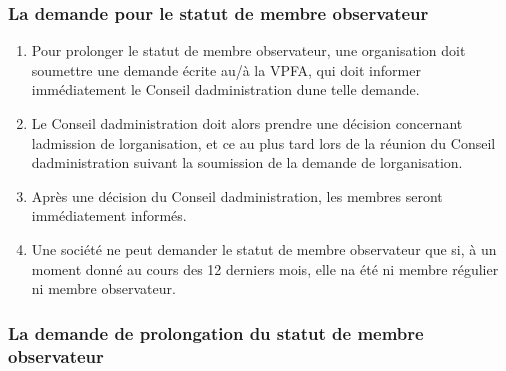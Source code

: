 \subsubsection{La demande pour le statut de membre observateur}
\label{la-demande-pour-le-statut-de-membre-observateur}

\begin{enumerate}
 \item
  Pour prolonger le statut de membre observateur, une organisation doit soumettre une demande écrite au/à la VPFA, qui doit informer immédiatement le Conseil d\textquotesingle administration d\textquotesingle une telle demande.
 \item
  Le Conseil d\textquotesingle administration doit alors prendre une décision concernant l\textquotesingle admission de l\textquotesingle organisation, et ce au plus tard lors de la réunion du Conseil d\textquotesingle administration suivant la soumission de la demande de l\textquotesingle organisation.
 \item
  Après une décision du Conseil d\textquotesingle administration, les membres seront immédiatement informés.
 \item
  Une société ne peut demander le statut de membre observateur que si, à un moment donné au cours des 12 derniers mois, elle n\textquotesingle a été ni membre régulier ni membre observateur.
\end{enumerate}

\subsubsection{La demande de prolongation du statut de membre observateur}
\label{la-demande-de-prolongation-du-statut-de-membre-observateur}

